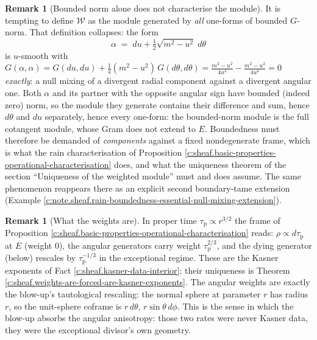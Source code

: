 \documentclass[11pt]{article}
\theoremstyle{definition}
\newtheorem{remark}[theorem]{Remark}
\theoremstyle{plain}
\providecommand{\shW}{}\renewcommand{\shW}{\mathcal{W}}
\begin{document}
\begin{remark}[Bounded norm alone does not characterise the module]\label{c:note.sheaf.bounded-norm-alone-does-not-characterise}
It is tempting to define $\shW$ as the module generated by \emph{all} one-forms of bounded $G$-norm. That definition collapses: the form
\[
\alpha \;=\; du + \tfrac12\sqrt{m^2 - u^2}\; d\theta
\]
is $u$-smooth with $G(\alpha, \alpha) = G(du,du) + \tfrac14 (m^2 - u^2)\, G(d\theta,d\theta) = \frac{m^2 - u^2}{4u^4} - \frac{m^2-u^2}{4u^4} = 0$ \emph{exactly}: a null mixing of a divergent radial component against a divergent angular one. Both $\alpha$ and its partner with the opposite angular sign have bounded (indeed zero) norm, so the module they generate contains their difference and sum, hence $d\theta$ and $du$ separately, hence every one-form: the bounded-norm module is the full cotangent module, whose Gram does not extend to $E$. Boundedness must therefore be demanded of \emph{components} against a fixed nondegenerate frame, which is what the rain characterisation of Proposition \ref{c:sheaf.basic-properties-operational-characterisation} does, and what the uniqueness theorem of the section ``Uniqueness of the weighted module'' must and does assume. The same phenomenon reappears there as an explicit second boundary-tame extension (Example \ref{c:note.sheaf.rain-boundedness-essential-null-mixing-extension}).
\end{remark}

\begin{remark}[What the weights are]\label{c:note.sheaf.what-weights-are}
In proper time $\tau_{\mathrm{p}} \propto r^{3/2}$ the frame of Proposition \ref{c:sheaf.basic-properties-operational-characterisation} reads: $\rho \propto d\tau_{\mathrm{p}}$ at $E$ (weight $0$), the angular generators carry weight $\tau_{\mathrm{p}}^{2/3}$, and the dying generator (below) rescales by $\tau_{\mathrm{p}}^{-1/3}$ in the exceptional regime. These are the Kasner exponents of Fact \ref{c:sheaf.kasner-data-interior}; their uniqueness is Theorem \ref{c:sheaf.weights-are-forced-are-kasner-exponents}. The angular weights are exactly the blow-up's tautological rescaling: the normal sphere at parameter $r$ has radius $r$, so the unit-sphere coframe is $r\,d\theta$, $r\sin\theta\,d\phi$. This is the sense in which the blow-up absorbs the angular anisotropy: those two rates were never Kasner data, they were the exceptional divisor's own geometry.
\end{remark}
\end{document}
